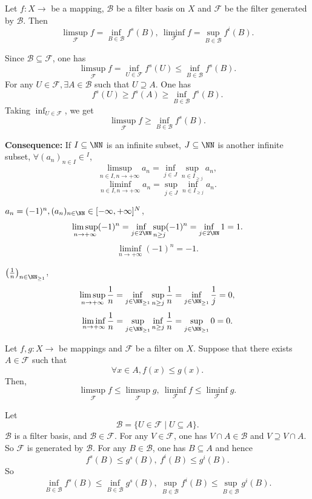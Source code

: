 \begin{propositionenv}
    Let $f:X\longrightarrow$  be a mapping, $\mathcal{B}$ be a filter basis on $X$ and $\mathcal{F}$ be the filter generated by $\mathcal{B}$. Then
    $$\limsup _{\mathcal{F}}f=\inf_{B\in \mathcal{B}}f^s(B),\ \liminf _{\mathcal{F}}f=\sup_{B\in \mathcal{B}}f^i(B).$$
\end{propositionenv}
\begin{proofenv}
    Since $\mathcal{B}\subseteq \mathcal{F}$, one has 
    $$\limsup_{\mathcal{F}}f=\inf_{U\in \mathcal{F}}f^s(U)\le \inf_{B\in \mathcal{B}}f^s(B).$$
    For any $U\in \mathcal{F},\exists A\in \mathcal{B}$ such that $U\supseteq A$. One has
    $$f^s(U)\ge f^s(A)\ge \inf_{B\in \mathcal{B}}f^s(B).$$
    Taking $\inf_{U\in \mathcal{F}}$, we get
    $$\limsup_{\mathcal{F}}f\ge \inf_{B\in \mathcal{B}}f^s(B).$$
\end{proofenv}
\begin{box2}
\textbf{Consequence:} \quad If $I\subseteq\NN$ is an infinite subset, $J\subseteq \NN$ is another infinite subset, $\forall (a_n)_{n\in I}\in $$^I$,
$$\limsup_{n\in I,n\rightarrow+\infty}a_n=\inf_{j\in J}\sup_{n\in I_{\ge j}}a_n,$$
$$\liminf_{n\in I,n\rightarrow+\infty}a_n=\sup_{j\in J}\inf_{n\in I_{\ge j}}a_n.$$
\end{box2}
\begin{exampleenv}
     $a_n=(-1)^n, (a_n)_{n\in \NN}\in [-\infty,+\infty]^N$,
     $$\limsup_{n\rightarrow +\infty}(-1)^n=\inf_{j\in 2\NN}\sup_{n\ge j}(-1)^n=\inf_{j\in 2\NN}1=1.$$
     $$\liminf_{n\rightarrow+\infty}(-1)^n=-1.$$
\end{exampleenv}
\begin{exampleenv}
    $\left(\frac{1}{n}\right)_{n\in \NN_{\ge 1}}$,
    $$\limsup_{n\rightarrow+\infty}\frac{1}{n}=\inf_{j\in \NN_{\ge 1}}\sup_{n\ge j}\frac{1}{n}=\inf_{j\in \NN_{\ge 1}}\frac{1}{j}=0,$$
    $$\liminf_{n\rightarrow+\infty}\frac{1}{n}=\sup_{j\in \NN_{\ge 1}}\inf_{n\ge j}\frac{1}{n}=\sup_{j\in \NN_{\ge 1}}0=0.$$
\end{exampleenv}
\begin{propositionenv}
    Let $f,g:X\longrightarrow $  be mappings and $\mathcal{F}$ be a filter on $X$. Suppose that there exists $A\in \mathcal{F}$ such that 
    $$\forall x\in A, f(x)\le g(x).$$
    Then,
    $$\limsup_{\mathcal{F}}f\le \limsup_{\mathcal{F}}g,\ \liminf_{\mathcal{F}}f\le \liminf_{\mathcal{F}}g.$$ 
\end{propositionenv}
\begin{proofenv}
    Let 
    $$\mathcal{B}=\{U\in \mathcal{F}\mid  U\subseteq A\}.$$
    $\mathcal{B}$ is a filter basis, and $\mathcal{B}\in \mathcal{F}$. For any $V\in \mathcal{ F}$, one has $V\cap A\in \mathcal{B}$ and $V\supseteq V\cap A$. So $\mathcal{F}$ is generated by $\mathcal{ B}$. For any $B\in \mathcal{B}$, one has $B\subseteq A$ and hence
    $$f^s(B)\le g^s(B),\ f^i(B)\le g^i(B).$$
    So 
    $$\inf_{B\in \mathcal{B}}f^s(B)\le \inf_{B\in \mathcal{B}}g^s(B),\ \sup_{B\in \mathcal{B}}f^i(B)\le \sup_{B\in \mathcal{B}}g^i(B).$$
\end{proofenv}
